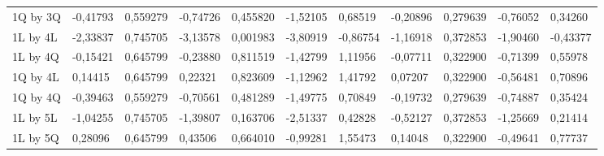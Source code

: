 \begin{table}[H]
{\begin{tabular}{lllllllllll}
\rowcolor[HTML]{FFFFFF} 
1Q by 3Q       & {\color[HTML]{181A1B} -0,41793} & {\color[HTML]{181A1B} 0,559279} & {\color[HTML]{181A1B} -0,74726} & {\color[HTML]{181A1B} 0,455820} & {\color[HTML]{181A1B} -1,52105} & {\color[HTML]{181A1B} 0,68519}  & {\color[HTML]{181A1B} -0,20896} & {\color[HTML]{181A1B} 0,279639} & {\color[HTML]{181A1B} -0,76052} & {\color[HTML]{181A1B} 0,34260}  \\
\rowcolor[HTML]{FFFFFF} 
1L by 4L       & {\color[HTML]{FF0000} -2,33837} & {\color[HTML]{FF0000} 0,745705} & {\color[HTML]{FF0000} -3,13578} & {\color[HTML]{FF0000} 0,001983} & {\color[HTML]{FF0000} -3,80919} & {\color[HTML]{FF0000} -0,86754} & {\color[HTML]{FF0000} -1,16918} & {\color[HTML]{FF0000} 0,372853} & {\color[HTML]{FF0000} -1,90460} & {\color[HTML]{FF0000} -0,43377} \\
\rowcolor[HTML]{FFFFFF} 
1L by 4Q       & {\color[HTML]{181A1B} -0,15421} & {\color[HTML]{181A1B} 0,645799} & {\color[HTML]{181A1B} -0,23880} & {\color[HTML]{181A1B} 0,811519} & {\color[HTML]{181A1B} -1,42799} & {\color[HTML]{181A1B} 1,11956}  & {\color[HTML]{181A1B} -0,07711} & {\color[HTML]{181A1B} 0,322900} & {\color[HTML]{181A1B} -0,71399} & {\color[HTML]{181A1B} 0,55978}  \\
\rowcolor[HTML]{FFFFFF} 
1Q by 4L       & {\color[HTML]{181A1B} 0,14415}  & {\color[HTML]{181A1B} 0,645799} & {\color[HTML]{181A1B} 0,22321}  & {\color[HTML]{181A1B} 0,823609} & {\color[HTML]{181A1B} -1,12962} & {\color[HTML]{181A1B} 1,41792}  & {\color[HTML]{181A1B} 0,07207}  & {\color[HTML]{181A1B} 0,322900} & {\color[HTML]{181A1B} -0,56481} & {\color[HTML]{181A1B} 0,70896}  \\
\rowcolor[HTML]{FFFFFF} 
1Q by 4Q       & {\color[HTML]{181A1B} -0,39463} & {\color[HTML]{181A1B} 0,559279} & {\color[HTML]{181A1B} -0,70561} & {\color[HTML]{181A1B} 0,481289} & {\color[HTML]{181A1B} -1,49775} & {\color[HTML]{181A1B} 0,70849}  & {\color[HTML]{181A1B} -0,19732} & {\color[HTML]{181A1B} 0,279639} & {\color[HTML]{181A1B} -0,74887} & {\color[HTML]{181A1B} 0,35424}  \\
\rowcolor[HTML]{FFFFFF} 
1L by 5L       & {\color[HTML]{181A1B} -1,04255} & {\color[HTML]{181A1B} 0,745705} & {\color[HTML]{181A1B} -1,39807} & {\color[HTML]{181A1B} 0,163706} & {\color[HTML]{181A1B} -2,51337} & {\color[HTML]{181A1B} 0,42828}  & {\color[HTML]{181A1B} -0,52127} & {\color[HTML]{181A1B} 0,372853} & {\color[HTML]{181A1B} -1,25669} & {\color[HTML]{181A1B} 0,21414}  \\
\rowcolor[HTML]{FFFFFF} 
1L by 5Q       & {\color[HTML]{181A1B} 0,28096}  & {\color[HTML]{181A1B} 0,645799} & {\color[HTML]{181A1B} 0,43506}  & {\color[HTML]{181A1B} 0,664010} & {\color[HTML]{181A1B} -0,99281} & {\color[HTML]{181A1B} 1,55473}  & {\color[HTML]{181A1B} 0,14048}  & {\color[HTML]{181A1B} 0,322900} & {\color[HTML]{181A1B} -0,49641} & {\color[HTML]{181A1B} 0,77737}  \\

\end{tabular}}
\end{table}
